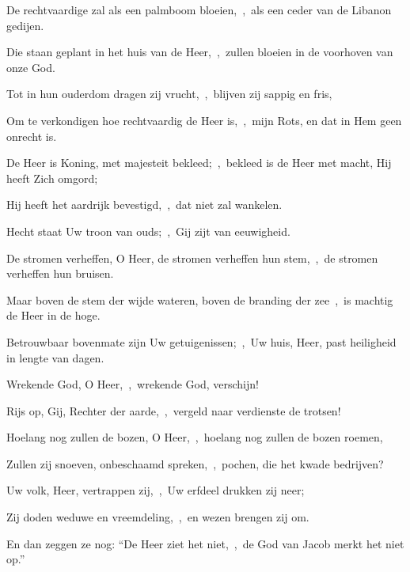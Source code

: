 \documentclass[12pt,twoside,a5paper]{article}
\begin{document}
\begin{halfparskip}

  De rechtvaardige zal als een palmboom bloeien,~\sep\ als een ceder van de Libanon gedijen.

  Die staan geplant in het huis van de Heer,~\sep\ zullen bloeien in de voorhoven van onze God.

  Tot in hun ouderdom dragen zij vrucht,~\sep\ blijven zij sappig en fris,

  Om te verkondigen hoe rechtvaardig de Heer is,~\sep\ mijn Rots, en dat in Hem geen onrecht is.
\end{halfparskip}



\begin{halfparskip}
  De Heer is Koning, met majesteit bekleed;~\sep\ bekleed is de Heer met macht, Hij heeft Zich omgord;


  Hij heeft het aardrijk bevestigd,~\sep\ dat niet zal wankelen.

  Hecht staat Uw troon van ouds;~\sep\ Gij zijt van eeuwigheid.

  De stromen verheffen, O Heer, de stromen verheffen hun stem,~\sep\ de stromen verheffen hun bruisen.

  Maar boven de stem der wijde wateren, boven de branding der zee~\sep\ is machtig de Heer in de hoge.

  Betrouwbaar bovenmate zijn Uw getuigenissen;~\sep\ Uw huis, Heer, past heiligheid in lengte van dagen.
\end{halfparskip}


\begin{halfparskip}

  Wrekende God, O Heer,~\sep\ wrekende God, verschijn!


  Rijs op, Gij, Rechter der aarde,~\sep\ vergeld naar verdienste de trotsen!

  Hoelang nog zullen de bozen, O Heer,~\sep\ hoelang nog zullen de bozen roemen,

  Zullen zij snoeven, onbeschaamd spreken,~\sep\ pochen, die het kwade bedrijven?

  Uw volk, Heer, vertrappen zij,~\sep\ Uw erfdeel drukken zij neer;

  Zij doden weduwe en vreemdeling,~\sep\ en wezen brengen zij om.

  En dan zeggen ze nog: ``De Heer ziet het niet,~\sep\ de God van Jacob merkt het niet op.''
\end{halfparskip}
\end{document}
